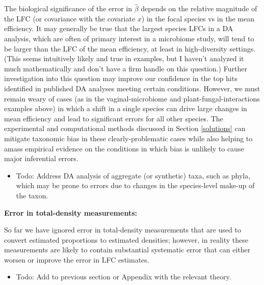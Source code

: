 \documentclass[
]{article}
\providecommand{\tightlist}{%
  \setlength{\itemsep}{0pt}\setlength{\parskip}{0pt}}
\theoremstyle{definition}
\theoremstyle{definition}
\theoremstyle{definition}
\theoremstyle{definition}
\theoremstyle{remark}
\begin{document}
The biological significance of the error in \(\hat \beta\) depends on the relative magnitude of the LFC (or covariance with the covariate \(x\)) in the focal species vs in the mean efficiency.
It may generally be true that the largest species LFCs in a DA analysis, which are often of primary interest in a microbiome study, will tend to be larger than the LFC of the mean efficiency, at least in high-diversity settings.
(This seems intuitively likely and true in examples, but I haven't analyzed it much mathematically and don't have a firm handle on this question.)
Further investigation into this question may improve our confidence in the top hits identified in published DA analyses meeting certain conditions.
However, we must remain weary of cases (as in the vaginal-microbiome and plant-fungal-interactions examples above) in which a shift in a single species can drive large changes in mean efficiency and lead to significant errors for all other species.
The experimental and computational methods discussed in Section \ref{solutions} can mitigate taxonomic bias in these clearly-problematic cases while also helping to amass empirical evidence on the conditions in which bias is unlikely to cause major inferential errors.

\begin{itemize}
\tightlist
\item
  Todo: Address DA analysis of aggregate (or synthetic) taxa, such as phyla, which may be prone to errors due to changes in the species-level make-up of the taxon.
\end{itemize}

\textbf{Error in total-density measurements:}

So far we have ignored error in total-density measurements that are used to convert estimated proportions to estimated densities;
however, in reality these measurements are likely to contain substantial systematic error that can either worsen or improve the error in LFC estimates.

\begin{itemize}
\tightlist
\item
  Todo: Add to previous section or Appendix with the relevant theory.
\end{itemize}
\end{document}
